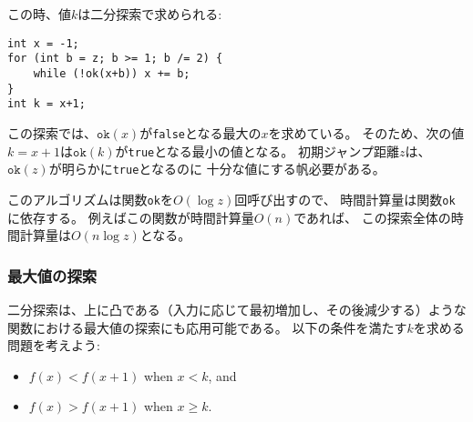 この時、値$k$は二分探索で求められる:

\begin{lstlisting}
int x = -1;
for (int b = z; b >= 1; b /= 2) {
    while (!ok(x+b)) x += b;
}
int k = x+1;
\end{lstlisting}

\begin{comment}
The search finds the largest value of $x$ for which
$\texttt{ok}(x)$ is \texttt{false}.
Thus, the next value $k=x+1$
is the smallest possible value for which
$\texttt{ok}(k)$ is \texttt{true}.
The initial jump length $z$ has to be
large enough, for example some value
for which we know beforehand that $\texttt{ok}(z)$ is \texttt{true}.

The algorithm calls the function \texttt{ok}
$O(\log z)$ times, so the total time complexity
depends on the function \texttt{ok}.
For example, if the function works in $O(n)$ time,
\end{comment}

この探索では、$\texttt{ok}(x)$が\texttt{false}となる最大の$x$を求めている。
そのため、次の値$k=x+1$は$\texttt{ok}(k)$が\texttt{true}となる最小の値となる。
初期ジャンプ距離$z$は、 $\texttt{ok}(z)$が明らかに\texttt{true}となるのに
十分な値にする帆必要がある。

このアルゴリズムは関数\texttt{ok}を$O(\log z)$回呼び出すので、
時間計算量は関数\texttt{ok}に依存する。
例えばこの関数が時間計算量$O(n)$であれば、
この探索全体の時間計算量は$O(n \log z)$となる。

\begin{comment}
\subsubsection{Finding the maximum value}

Binary search can also be used to find
the maximum value for a function that is
first increasing and then decreasing.
Our task is to find a position $k$ such that
\end{comment}

\subsubsection{最大値の探索}

二分探索は、上に凸である（入力に応じて最初増加し、その後減少する）ような
関数における最大値の探索にも応用可能である。
以下の条件を満たす$k$を求める問題を考えよう:

\begin{itemize}
\item
$f(x)<f(x+1)$ when $x<k$, and
\item
$f(x)>f(x+1)$ when $x \ge k$.
\end{itemize}

